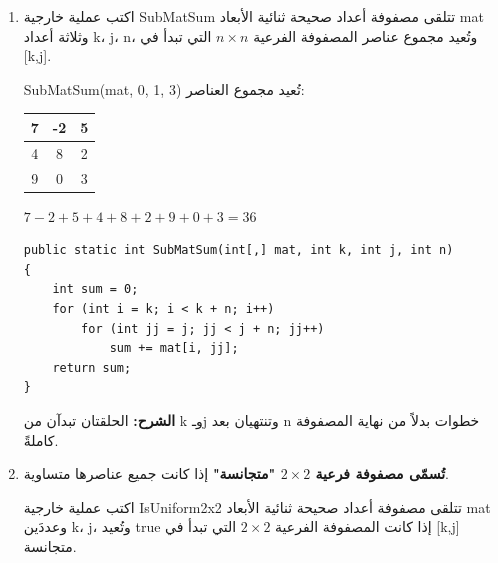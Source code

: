\documentclass[14pt]{extarticle}
\begin{document}
\begin{enumerate}[itemsep=2em]

\item
اكتب عملية خارجية \textenglish{SubMatSum} تتلقى مصفوفة أعداد صحيحة ثنائية الأبعاد \textenglish{mat} وثلاثة أعداد \textenglish{k}، \textenglish{j}، \textenglish{n}، وتُعيد مجموع عناصر المصفوفة الفرعية $n\times n$ التي تبدأ في \textenglish{[k,j]}.

\begin{boxExample}
\textenglish{SubMatSum(mat, 0, 1, 3)} تُعيد مجموع العناصر:
\begin{center}
\begin{english}
\begin{tabular}{|c|c|c|}
\hline
7 & -2 & 5 \\
\hline
4 &  8 & 2 \\
\hline
9 &  0 & 3 \\
\hline
\end{tabular}
\end{english}
\end{center}
$7-2+5+4+8+2+9+0+3 = 36$
\end{boxExample}

\ifwithsols
\begin{boxSolution}
\begin{boxCode}
\begin{english}
\begin{verbatim}
public static int SubMatSum(int[,] mat, int k, int j, int n)
{
    int sum = 0;
    for (int i = k; i < k + n; i++)
        for (int jj = j; jj < j + n; jj++)
            sum += mat[i, jj];
    return sum;
}
\end{verbatim}
\end{english}
\end{boxCode}
\textbf{الشرح:} الحلقتان تبدآن من \textenglish{k} وـ\textenglish{j} وتنتهيان بعد \textenglish{n} خطوات بدلاً من نهاية المصفوفة كاملةً.
\end{boxSolution}
\clearpage
\fi

\item
\textbf{تُسمّى مصفوفة فرعية $2\times2$ "متجانسة"} إذا كانت جميع عناصرها متساوية.

اكتب عملية خارجية \textenglish{IsUniform2x2} تتلقى مصفوفة أعداد صحيحة ثنائية الأبعاد \textenglish{mat} وعددَين \textenglish{k}، \textenglish{j}، وتُعيد \textenglish{true} إذا كانت المصفوفة الفرعية $2\times2$ التي تبدأ في \textenglish{[k,j]} متجانسة.


\end{enumerate}
\end{document}
